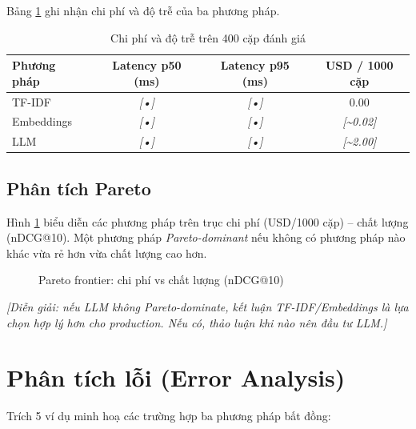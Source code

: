 \documentclass[../DoAn.tex]{subfiles}
\begin{document}
Bảng \ref{tab:rq2_cost} ghi nhận chi phí và độ trễ của ba phương pháp.

\begin{table}[H]
\centering
\caption{Chi phí và độ trễ trên 400 cặp đánh giá}
\label{tab:rq2_cost}
\begin{tabular}{|l|c|c|c|}
\hline
\textbf{Phương pháp} & \textbf{Latency p50 (ms)} & \textbf{Latency p95 (ms)} & \textbf{USD / 1000 cặp} \\ \hline
TF-IDF       & \textit{[•]} & \textit{[•]} & 0.00 \\ \hline
Embeddings   & \textit{[•]} & \textit{[•]} & \textit{[\textasciitilde 0.02]} \\ \hline
LLM          & \textit{[•]} & \textit{[•]} & \textit{[\textasciitilde 2.00]} \\ \hline
\end{tabular}
\end{table}

\subsection{Phân tích Pareto}

Hình \ref{fig:pareto} biểu diễn các phương pháp trên trục chi phí (USD/1000 cặp) -- chất lượng (nDCG@10). Một phương pháp \textit{Pareto-dominant} nếu không có phương pháp nào khác vừa rẻ hơn vừa chất lượng cao hơn.

\begin{figure}[H]
\centering
{}
\caption{Pareto frontier: chi phí vs chất lượng (nDCG@10)}
\label{fig:pareto}
\end{figure}

\textit{[Diễn giải: nếu LLM không Pareto-dominate, kết luận TF-IDF/Embeddings là lựa chọn hợp lý hơn cho production. Nếu có, thảo luận khi nào nên đầu tư LLM.]}

\section{Phân tích lỗi (Error Analysis)}
\label{sec:err}

Trích 5 ví dụ minh hoạ các trường hợp ba phương pháp bất đồng:
\end{document}

